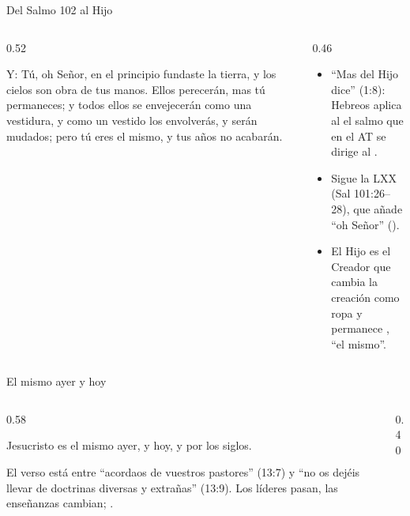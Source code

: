 \begin{frame}{Del Salmo 102 al Hijo}
\begin{columns}[t,onlytextwidth]
\begin{column}{0.52\textwidth}
\begin{cita}Y: Tú, oh Señor, en el principio fundaste la tierra, y los cielos son obra de tus manos. Ellos perecerán, mas tú permaneces; y todos ellos se envejecerán como una vestidura, y como un vestido los envolverás, y serán mudados; pero tú eres el mismo, y tus años no acabarán.\end{cita}
\end{column}
\begin{column}{0.46\textwidth}\small
\begin{itemize}
\item ``Mas del Hijo dice'' (1:8): Hebreos aplica al  el salmo que en el AT se dirige al \SENOR.
\item Sigue la LXX (Sal 101:26--28), que añade ``oh Señor'' ().
\item El Hijo es el Creador que cambia la creación como ropa y permanece , ``el mismo''.
\end{itemize}
\end{column}
\end{columns}
\end{frame}

\begin{frame}{El mismo ayer y hoy}
\begin{columns}[c,onlytextwidth]
\begin{column}{0.58\textwidth}
\begin{cita}Jesucristo es el mismo ayer, y hoy, y por los siglos.\end{cita}
\begin{center}\end{center}
\small El verso está entre ``acordaos de vuestros pastores'' (13:7) y ``no os dejéis llevar de doctrinas diversas y extrañas'' (13:9). Los líderes pasan, las enseñanzas cambian; .
\end{column}
\begin{column}{0.40\textwidth}\end{column}
\end{columns}
\end{frame}

